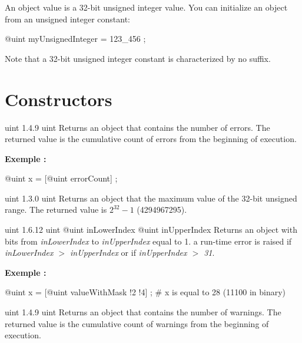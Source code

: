 

An  object value is a 32-bit unsigned integer value. You can initialize an  object from an unsigned integer constant:\\

\begin{galgascode}
@uint myUnsignedInteger = 123_456 ;
\end{galgascode}

Note that a 32-bit unsigned integer constant is characterized by no suffix.

\section{Constructors}

{uint}
{1.4.9}
{uint}
{Returns an  object that contains the number of errors.}
{The returned value is the cumulative count of errors from the beginning of execution.}

\textbf{Exemple :}
\begin{galgascode}
@uint x = [@uint errorCount] ;
\end{galgascode}

{uint}
{1.3.0}
{uint}
{Returns an  object that the maximum value of the 32-bit unsigned range.}
{The returned value is $2^{32}-1$ (4294967295).}


{uint}
{1.6.12}
{uint}
{@uint inLowerIndex}
{@uint inUpperIndex}
{Returns an  object with bits from \emph{inLowerIndex} to \emph{inUpperIndex} equal to 1.}
{a run-time error is raised if \emph{inLowerIndex $>$ inUpperIndex} or if \emph{inUpperIndex $>$ 31}.}



\textbf{Exemple :}
\begin{galgascode}
@uint x = [@uint valueWithMask !2 !4] ; # x is equal to 28 (11100 in binary)
\end{galgascode}




{uint}
{1.4.9}
{uint}
{Returns an  object that contains the number of warnings.}
{The returned value is the cumulative count of warnings from the beginning of execution.}

